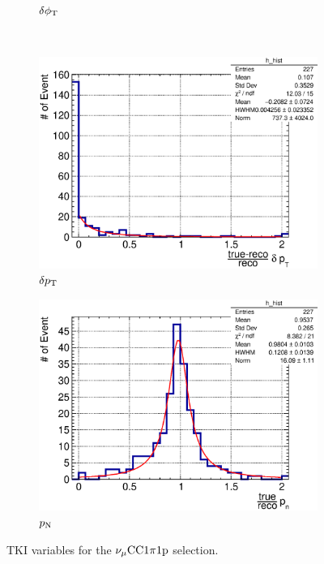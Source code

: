 \begin{figure}
\begin{subfigure}[b]{\dbfigwid\textwidth}
               \caption{$\delta\phi_\textrm{T}$}
               \label{subfig:1pi-dphit}
          \end{subfigure}
          \\
          \begin{subfigure}[b]{\dbfigwid\textwidth}
               \centering
               \includegraphics[width=\textwidth]{figures/perf/tki/SFGpTPCmu_dpt_rat_hist_al14.eps}
               \caption{$\delta p_\textrm{T}$}
               \label{subfig:1pi-dpt}
          \end{subfigure}
          \begin{subfigure}[b]{\dbfigwid\textwidth}
               \centering
               \includegraphics[width=\textwidth]{figures/perf/tki/SFGpTPCmu_pn_rat_hist_al14.eps}
               \caption{$p_\textrm{N}$}
               \label{subfig:1pi-pn}
          \end{subfigure}
          \caption{TKI variables for the $\nu_{\mu}\textrm{CC}1\pi1\textrm{p}$ selection.}
          \label{fig:mc-tki-1pi}
     \end{figure}
     

